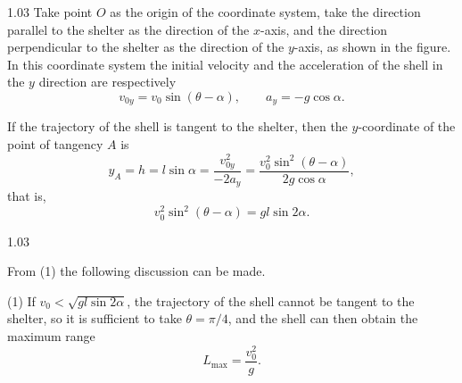 \begin{solution}{1.03}
Take point $O$ as the origin of the coordinate system, take the direction parallel to the
shelter as the direction of the $x$-axis, and the direction perpendicular to the shelter as the
direction of the $y$-axis, as shown in the figure. In this coordinate system the initial
velocity and the acceleration of the shell in the $y$ direction are respectively
\begin{equation*}
v_{0y} = v_0\sin(\theta-\alpha),\qquad a_y = -g\cos\alpha.
\end{equation*}

If the trajectory of the shell is tangent to the shelter, then the $y$-coordinate of the point
of tangency $A$ is
\begin{equation*}
y_A = h = l\sin\alpha = \frac{v_{0y}^2}{-2a_y}
= \frac{v_0^2\sin^2(\theta-\alpha)}{2g\cos\alpha},
\end{equation*}
that is,
\begin{equation}
v_0^2\sin^2(\theta-\alpha) = gl\sin 2\alpha. \tag{1}
\end{equation}

\begin{figbox}{1.03}
\end{figbox}

From (1) the following discussion can be made.

(1) If $v_0<\sqrt{gl\sin 2\alpha}$, the trajectory of the shell cannot be tangent to the shelter,
so it is sufficient to take $\theta=\pi/4$, and the shell can then obtain the maximum range
\begin{equation*}
L_{\max} = \frac{v_0^2}{g}.
\end{equation*}


\end{solution}
